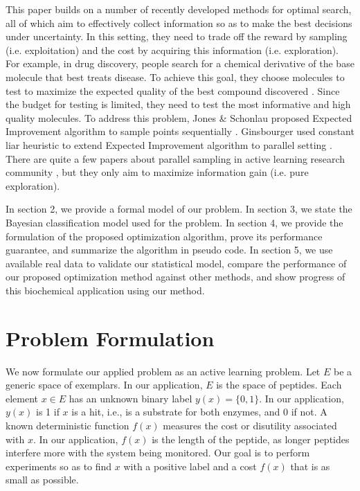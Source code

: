 \documentclass[12pt]{article}
\begin{document}
This paper builds on a number of recently developed methods for optimal search, all of which aim to effectively collect information so as to make the best decisions under uncertainty. In this setting, they need to trade off the reward by sampling (i.e. exploitation) and the cost by acquiring this information (i.e. exploration). For example, in drug discovery, people search for a chemical derivative of the base molecule that best treats disease. To achieve this goal, they choose molecules to test to maximize the expected quality of the
best compound discovered \citep{Negoescu2010}. Since the budget for testing is limited, they need to test the most informative and high quality molecules. To address this problem, Jones \& Schonlau proposed Expected Improvement algorithm to sample points sequentially \citep{Jones1998}. Ginsbourger used constant liar heuristic to extend Expected Improvement algorithm to parallel setting \citep{Ginsbourger2008}. There are quite a few papers about parallel sampling in active learning research
community \citep{Chen2013, Hoi2006, Hoi2006a} , but they only aim to maximize information gain (i.e. pure exploration).

In section 2, we provide a formal model of our problem.  In section 3, we state the Bayesian classification model used for the problem. In section 4, we provide the formulation of the proposed optimization algorithm, prove its performance guarantee, and summarize the algorithm in pseudo code. In section 5, we use available real data to validate our statistical model, compare the performance of our proposed optimization method against
other methods, and show progress of this biochemical application using our method.

\section{Problem Formulation} \label{sec:problem}

We now formulate our applied problem as an active learning problem.  
Let $E$ be a generic space of exemplars.  In our application, $E$ is the space of peptides. Each element $x \in E$ has an unknown binary label $y(x)=\{0,1\}$.  In our application, $y(x)$ is 1 if $x$ is a hit, i.e., is a substrate for both enzymes, and 0 if not.
A known deterministic function $f(x)$ measures the cost or disutility associated with $x$.  In our application, $f(x)$ is the length of the peptide, as longer peptides interfere more with the system being monitored. Our goal is to perform experiments so as to find $x$ with a positive label and a cost $f(x)$ that is as small as possible.
\end{document}

